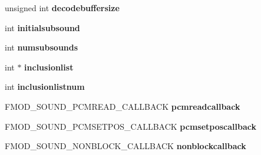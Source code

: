 \begin{DoxyCompactItemize}
\item 
\hypertarget{struct_f_m_o_d___c_r_e_a_t_e_s_o_u_n_d_e_x_i_n_f_o_a854f54e774c81c959da15a09348af9bf}{unsigned int {\bfseries decodebuffersize}}\label{struct_f_m_o_d___c_r_e_a_t_e_s_o_u_n_d_e_x_i_n_f_o_a854f54e774c81c959da15a09348af9bf}

\item 
\hypertarget{struct_f_m_o_d___c_r_e_a_t_e_s_o_u_n_d_e_x_i_n_f_o_a0b6b37604abb632c74c1912b7de6cf8a}{int {\bfseries initialsubsound}}\label{struct_f_m_o_d___c_r_e_a_t_e_s_o_u_n_d_e_x_i_n_f_o_a0b6b37604abb632c74c1912b7de6cf8a}

\item 
\hypertarget{struct_f_m_o_d___c_r_e_a_t_e_s_o_u_n_d_e_x_i_n_f_o_a84eebd6ba29eb025470d074fb9c36c32}{int {\bfseries numsubsounds}}\label{struct_f_m_o_d___c_r_e_a_t_e_s_o_u_n_d_e_x_i_n_f_o_a84eebd6ba29eb025470d074fb9c36c32}

\item 
\hypertarget{struct_f_m_o_d___c_r_e_a_t_e_s_o_u_n_d_e_x_i_n_f_o_a2759b91d6391ab83f6b1c4e52589d559}{int $\ast$ {\bfseries inclusionlist}}\label{struct_f_m_o_d___c_r_e_a_t_e_s_o_u_n_d_e_x_i_n_f_o_a2759b91d6391ab83f6b1c4e52589d559}

\item 
\hypertarget{struct_f_m_o_d___c_r_e_a_t_e_s_o_u_n_d_e_x_i_n_f_o_ab06a599a0214646ffe412edc75ef812e}{int {\bfseries inclusionlistnum}}\label{struct_f_m_o_d___c_r_e_a_t_e_s_o_u_n_d_e_x_i_n_f_o_ab06a599a0214646ffe412edc75ef812e}

\item 
\hypertarget{struct_f_m_o_d___c_r_e_a_t_e_s_o_u_n_d_e_x_i_n_f_o_a2d4f46a1719329771d73449abc6b71ed}{F\+M\+O\+D\+\_\+\+S\+O\+U\+N\+D\+\_\+\+P\+C\+M\+R\+E\+A\+D\+\_\+\+C\+A\+L\+L\+B\+A\+C\+K {\bfseries pcmreadcallback}}\label{struct_f_m_o_d___c_r_e_a_t_e_s_o_u_n_d_e_x_i_n_f_o_a2d4f46a1719329771d73449abc6b71ed}

\item 
\hypertarget{struct_f_m_o_d___c_r_e_a_t_e_s_o_u_n_d_e_x_i_n_f_o_acca3da4c7a233e2455b92094a4aeb435}{F\+M\+O\+D\+\_\+\+S\+O\+U\+N\+D\+\_\+\+P\+C\+M\+S\+E\+T\+P\+O\+S\+\_\+\+C\+A\+L\+L\+B\+A\+C\+K {\bfseries pcmsetposcallback}}\label{struct_f_m_o_d___c_r_e_a_t_e_s_o_u_n_d_e_x_i_n_f_o_acca3da4c7a233e2455b92094a4aeb435}

\item 
\hypertarget{struct_f_m_o_d___c_r_e_a_t_e_s_o_u_n_d_e_x_i_n_f_o_a8cd5e4d0cd9d2fa8b95fa76f3efff19a}{F\+M\+O\+D\+\_\+\+S\+O\+U\+N\+D\+\_\+\+N\+O\+N\+B\+L\+O\+C\+K\+\_\+\+C\+A\+L\+L\+B\+A\+C\+K {\bfseries nonblockcallback}}\label{struct_f_m_o_d___c_r_e_a_t_e_s_o_u_n_d_e_x_i_n_f_o_a8cd5e4d0cd9d2fa8b95fa76f3efff19a}


\end{DoxyCompactItemize}
